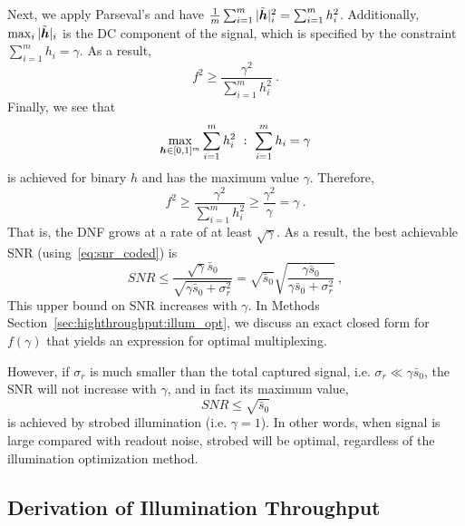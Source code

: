 Next, we apply Parseval's and have $\frac{1}{m}\sum_{i=1}^m |\tilde {\bm{h}}|_i^2 = \sum_{i=1}^m h_i^2$.
Additionally, $\max_i |\tilde {\bm{h}}|_i$ is the DC component of the signal, which is specified by the constraint $\sum_{i=1}^m h_i = \gamma$.
As a result, $$ f^2 \geq \frac{\gamma^2}{\sum_{i=1}^m h_i^2}\:.$$
Finally, we see that
$$\max_{\bm{h}\in[0,1]^m} \sum_{i=1}^m h_i^2~:~ \sum_{i=1}^m h_i=\gamma$$
is achieved for binary $h$ and has the maximum value $\gamma$. Therefore, 
\[f^2 \geq \frac{\gamma^2}{\sum_{i=1}^m h_i^2} \geq \frac{\gamma^2}{\gamma} = \gamma\:.\]
That is, the DNF grows at a rate of at least $\sqrt{\gamma}$. As a result,  the best achievable SNR (using~\eqref{eq:snr_coded}) is
$$ SNR  \leq \frac{\sqrt{\gamma}\bar{s}_0}{\sqrt{\gamma\bar{s}_0 + \sigma^2_{r}}}
=\sqrt{\bar{s}_0}\sqrt{\frac{\gamma \bar{s}_0 }{\gamma\bar{s}_0 + \sigma^2_{r}}}\:,
$$
This upper bound on SNR increases with ${\gamma}$.
In Methods Section~\ref{sec:highthroughput:illum_opt}, we discuss an exact closed form for $f(\gamma)$ that yields an expression for optimal multiplexing.

However, if $\sigma_r$ is much smaller than the total captured signal, i.e. $\sigma_r \ll \gamma \bar{s}_0 $, the SNR will not increase with $\gamma$, and in fact its maximum value,
$$SNR \leq \sqrt{\bar{s}_0}$$
is achieved by strobed illumination (i.e. $\gamma=1$). In other words, when signal is large compared with readout noise, strobed will be optimal, regardless of the illumination optimization method.


\subsection{Derivation of Illumination Throughput}\label{sec:appendix:app_throughput}

